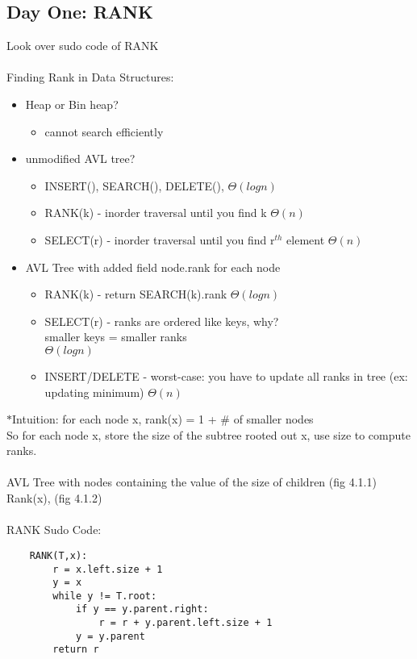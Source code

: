 \documentclass{article}
\begin{document}
	\subsection{Day One: RANK\\}
	Look over sudo code of RANK\\\\
	Finding Rank in Data Structures:
	\begin{itemize}
		\item Heap or Bin heap?
		\begin{itemize}
			\item cannot search efficiently
		\end{itemize}
		\item unmodified AVL tree?
		\begin{itemize}
			\item INSERT(), SEARCH(), DELETE(), $\Theta(log n)$
			\item RANK(k) - inorder traversal until you find k $\Theta(n)$
			\item SELECT(r) - inorder traversal until you find r$^{th}$ element $\Theta(n)$
		\end{itemize}
		\item AVL Tree with added field node.rank for each node
		\begin{itemize}
			\item RANK(k) - return SEARCH(k).rank $\Theta(log n)$
			\item SELECT(r) - ranks are ordered like keys, why?\\
			smaller keys = smaller ranks\\ $\Theta(log n)$
			\item INSERT/DELETE - worst-case: you have to update all ranks in tree (ex: updating minimum) $\Theta(n)$
		\end{itemize}
	\end{itemize}
	$*$Intuition: for each node x, rank(x) = 1 + \# of smaller nodes\\
	So for each node x, store the size of the subtree rooted out x, use size to compute ranks.\\\\
	AVL Tree with nodes containing the value of the size of children (fig 4.1.1)\\
	Rank(x), (fig 4.1.2)\\\\
	RANK Sudo Code: 
	\begin{lstlisting}
	RANK(T,x):
		r = x.left.size + 1
		y = x
		while y != T.root:
			if y == y.parent.right:
				r = r + y.parent.left.size + 1
			y = y.parent
		return r
	\end{lstlisting}
\end{document}
